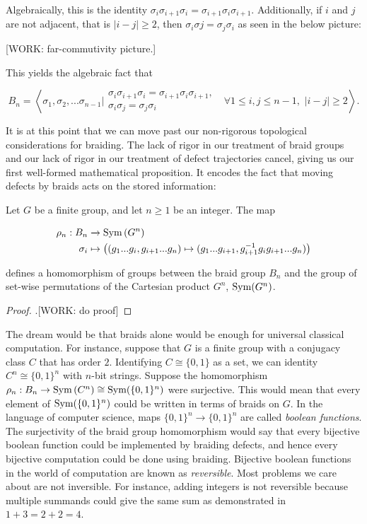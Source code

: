Algebraically, this is the identity $\sigma_{i}\sigma_{i+1}\sigma_{i}=\sigma_{i+1}\sigma_{i}\sigma_{i+1}$. Additionally, if $i$ and $j$ are not adjacent, that is $|i-j|\geq 2$, then $\sigma_{i}\sigma{j}=\sigma_j\sigma_i$ as seen in the below picture:

[WORK: far-commutivity picture.]

This yields the algebraic fact that

$$B_n=\left<\left.\sigma_1,\sigma_2,...\sigma_{n-1}\right| \substack{\sigma_{i}\sigma_{i+1}\sigma_{i}=\sigma_{i+1}\sigma_{i}\sigma_{i+1}, \\ \sigma_i\sigma_j=\sigma_j\sigma_i}\,\,\,\,\forall 1\leq i,j \leq n-1,\,\, |i-j|\geq 2\right>.$$

It is at this point that we can move past our non-rigorous topological considerations for braiding. The lack of rigor in our treatment of braid groups and our lack of rigor in our treatment of defect trajectories cancel, giving us our first well-formed mathematical proposition. It encodes the fact that moving defects by braids acts on the stored information:

\begin{proposition} Let $G$ be a finite group, and let $n\geq 1$ be an integer. The map

\begin{align*}
\rho_n: B_n &\xrightarrow{} \operatorname{Sym}\left(G^n\right)\\
\sigma_i &\mapsto \left((g_1... g_i, g_{i+1} ... g_n)\mapsto (g_1... g_{i+1}, g_{i+1}^{-1}g_i g_{i+1} ... g_n) \right)
\end{align*}

defines a homomorphism of groups between the braid group $B_n$ and the group of set-wise permutations of the Cartesian product $G^n$, $\operatorname{Sym}(G^n)$.
\end{proposition}
\begin{proof}.[WORK: do proof]
\end{proof}

The dream would be that braids alone would be enough for universal classical computation. For instance, suppose that $G$ is a finite group with a conjugacy class $C$ that has order $2$. Identifying $C\cong \{0,1\}$ as a set, we can identity $C^n\cong \{0,1\}^{n}$ with $n$-bit strings. Suppose the homomorphism $\rho_n:B_n\to \operatorname{Sym}\left(C^n\right)\cong \operatorname{Sym}(\{0,1\}^n)$ were surjective. This would mean that every element of $\operatorname{Sym}(\{0,1\}^n)$ could be written in terms of braids on $G$. In the language of computer science, maps $\{0,1\}^n\to \{0,1\}^n$ are called \textit{boolean functions}. The surjectivity of the braid group homomorphism would say that every bijective boolean function could be implemented by braiding defects, and hence every bijective computation could be done using braiding. Bijective boolean functions in the world of computation are known as \textit{reversible}. Most problems we care about are not inversible. For instance, adding integers is not reversible because multiple summands could give the same sum as demonstrated in $1 + 3 = 2 + 2 = 4$.

